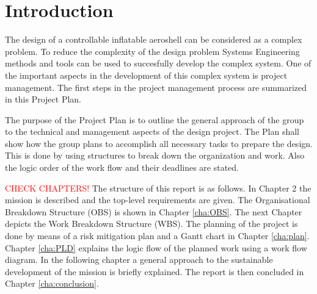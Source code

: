\section{Introduction}\label{cha:introduction}
The design of a controllable inflatable aeroshell can be considered as a complex problem. To reduce the complexity of the design problem Systems Engineering methods and tools can be used to succesfully develop the complex system. One of the important aspects in the development of this complex system is project management. The first steps in the project management process are summarized in this Project Plan.

The purpose of the Project Plan is to outline the general approach of the group to the technical and management aspects of the design project. The Plan shall show how the group plans to accomplish all necessary tasks to prepare the design. This is done by using structures to break down the organization and work. Also the logic order of the work flow and their deadlines are stated.

\textcolor{red}{CHECK CHAPTERS!}
The structure of this report is as follows. In Chapter 2 the mission is described and the top-level requirements are given. The Organisational Breakdown Structure (OBS) is shown in Chapter \ref{cha:OBS}. The next Chapter depicts the Work Breakdown Structure (WBS). The planning of the project is done by means of a risk mitigation plan and a Gantt chart in Chapter \ref{cha:plan}. Chapter \ref{cha:PLD} explains the logic flow of the planned work using a work flow diagram. In the following chapter a general approach to the sustainable development of the mission is briefly explained. The report is then concluded in Chapter \ref{cha:conclusion}.